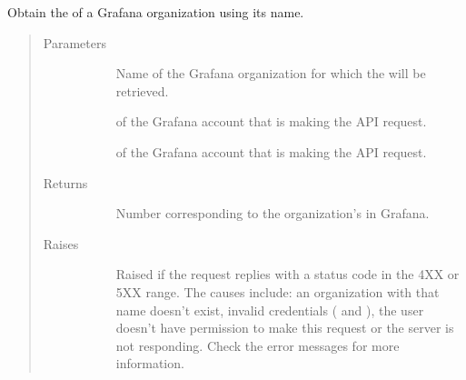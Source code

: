 \documentclass[letterpaper,10pt,english]{sphinxmanual}
\begin{document}
\begin{fulllineitems}
\label{\detokenize{grafanaAPI:grafanaAPI.getOrgId}}
Obtain the  of a Grafana organization using its name.
\begin{quote}\begin{description}
\item[{Parameters}] \leavevmode\begin{description}
\item[{}] \leavevmode{[}\sphinxtitleref{str}{]}
Name of the Grafana organization for which the  will be retrieved.

\item[{}] \leavevmode{[}\sphinxtitleref{str}{]}
 of the Grafana account that is making the API request.

\item[{}] \leavevmode{[}\sphinxtitleref{str}{]}
 of the Grafana account that is making the API request.

\end{description}

\item[{Returns}] \leavevmode\begin{description}
\item[{}] \leavevmode{[}\sphinxtitleref{int}{]}
Number corresponding to the organization’s  in Grafana.

\end{description}

\item[{Raises}] \leavevmode\begin{description}
\item[{}] \leavevmode
Raised if the request replies with a status code in the 4XX or 5XX range.
The causes include: an organization with that name doesn’t exist, invalid
credentials ( and ), the user doesn’t have permission to
make this request or the server is not responding. Check the error messages
for more information.

\end{description}

\end{description}\end{quote}







\end{fulllineitems}
\end{document}
